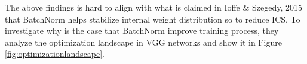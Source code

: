 \documentclass{article}
\begin{document}
The above findings is hard to align with what is claimed in Ioffe \& Szegedy, 2015  \cite{batchnorm} that BatchNorm helps stabilize internal weight distribution so to reduce ICS. To investigate why is the case that BatchNorm improve training process, they analyze the optimization landscape in VGG networks and show it in Figure \ref{fig:optimizationlandscape}.

\end{document}
